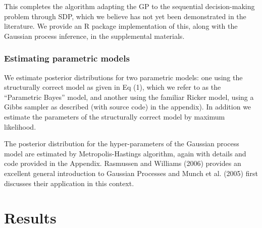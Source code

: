 \documentclass[author-year, review]{elsarticle} %
\begin{document}
This completes the algorithm adapting the GP to the sequential
decision-making problem through SDP, which we believe has not yet been
demonstrated in the literature. We provide an R package implementation
of this, along with the Gaussian process inference, in the supplemental
materials.

\subsubsection{Estimating parametric models}

We estimate posterior distributions for two parametric models: one using
the structurally correct model as given in Eq (1), which we refer to as
the ``Parametric Bayes'' model, and another using the familiar Ricker
model, using a Gibbs sampler as described (with source code) in the
appendix). In addition we estimate the parameters of the structurally
correct model by maximum likelihood.

The posterior distribution for the hyper-parameters of the Gaussian
process model are estimated by Metropolis-Hastings algorithm, again with
details and code provided in the Appendix. Rasmussen and Williams (2006)
provides an excellent general introduction to Gaussian Processes and
Munch et al. (2005) first discusses their application in this context.

\section{Results}
\end{document}
